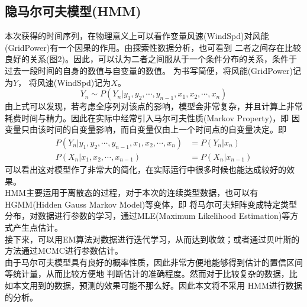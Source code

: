 \documentclass{ctexart}
\begin{document}
\subsection{隐马尔可夫模型(HMM)}
本次获得的时间序列，在物理意义上可以看作变量风速(WindSpd)对风能(GridPower)有一个因果的作用。由探索性数据分析，也可看到
二者之间存在比较良好的关系(图2)。因此，可以认为二者之间服从于一个条件分布的关系，条件于过去一段时间的自身的数值与自变量的数值。
为书写简便，将风能(GridPower)记为$Y$，
将风速(WindSpd)记为$X$。
\begin{equation*}
    Y_n \sim P(Y_n|y_1,y_2,\cdots,y_{n-1},x_1,x_2,\cdots,x_n)
\end{equation*}
由上式可以发现，若考虑全序列对该点的影响，模型会非常复杂，并且计算上非常耗费时间与精力。因此在实际中经常引入马尔可夫性质(Markov Property)，即
因变量只由该时间的自变量影响，而自变量仅由上一个时间点的自变量决定。即
\begin{align*}
    P(Y_n|y_1,y_2,\cdots,y_{n-1},x_1,x_2,\cdots,x_n) &= P(Y_n|x_n)\\
    P(X_n|x_1,x_2,\cdots,x_{n-1}) &= P(X_n|x_{n-1}) 
\end{align*}
可以看出这对模型作了非常大的简化，在实际运行中很多时候也能达成较好的效果。\\
\indent HMM主要运用于离散态的过程，对于本次的连续类型数据，也可以有HGMM(Hidden Gauss Markov Model)等变体，即
将马尔可夫矩阵变成特定类型分布，对数据进行参数的学习，通过MLE(Maximum Likelihood Estimation)等方式产生点估计。\\
\indent 接下来，可以用EM算法对数据进行迭代学习，从而达到收敛；或者通过贝叶斯的方法通过MCMC进行参数估计。\\
\indent 由于马尔可夫模型具有良好的概率性质，因此非常方便地能够得到估计的置信区间等统计量，从而比较方便地
判断估计的准确程度。然而对于比较复杂的数据，比如本文用到的数据，预测的效果可能不那么好。因此本文将不采用
HMM进行数据的分析。
\end{document}
